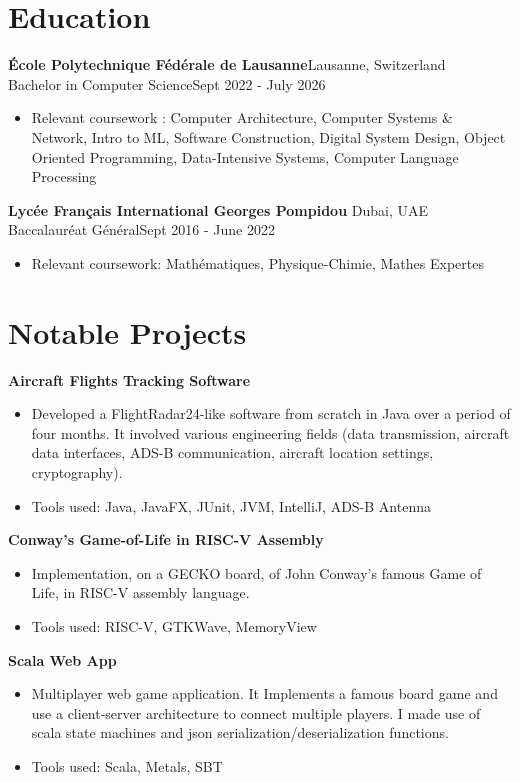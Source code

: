 \documentclass[a4paper, 10pt]{article}
\newenvironment{highlights}{
    \begin{itemize}[
        topsep=0.10 cm,
        parsep=0.10 cm,
        partopsep=0pt,
        itemsep=0pt,
        leftmargin=0.4 cm + 10pt
    ]
}{
    \end{itemize}
} %
\let\hrefWithoutArrow\href
\renewcommand{\href}[2]{\hrefWithoutArrow{#1}{\ifthenelse{\equal{#2}{}}{ }{#2 }\raisebox{.15ex}{\footnotesize \faExternalLink*}}}
\begin{document}
    \section{Education}
        \textbf{École Polytechnique Fédérale de Lausanne}\hfill Lausanne, Switzerland\\
        Bachelor in Computer Science\hfill Sept 2022 - July 2026
        \begin{highlights}
            \item Relevant coursework : Computer Architecture, Computer Systems \& Network, Intro to ML, Software Construction, Digital System Design, Object Oriented Programming, 
            Data-Intensive Systems, Computer Language Processing %
        \end{highlights}
        \textbf{Lycée Français International Georges Pompidou} \hfill Dubai, UAE\\
        Baccalauréat Général\hfill Sept 2016 - June 2022
        \begin{highlights}
            \item Relevant coursework: Mathématiques, Physique-Chimie, Mathes Expertes
        \end{highlights}
    
    \section{Notable Projects} 
        \textbf{Aircraft Flights Tracking Software}\href{https://github.com/relogamimano/Javions}{}
        \begin{highlights}
            \item Developed a FlightRadar24-like software from scratch in Java over a period of four months. It involved various
            engineering fields (data transmission, aircraft data interfaces, ADS-B communication, aircraft location settings, cryptography).
            \item Tools used: Java, JavaFX, JUnit, JVM, IntelliJ, ADS-B Antenna
        \end{highlights}

        \textbf{Conway's Game-of-Life in RISC-V Assembly}\href{https://github.com/relogamimano/Conway-s-Game-of-Life-in-RISC-V-Assembly}{}
        \begin{highlights}
            \item Implementation, on a GECKO board, of John Conway's famous Game of Life, in RISC-V assembly language.
            \item Tools used: RISC-V, GTKWave, MemoryView
        \end{highlights}
        \textbf{Scala Web App}\href{https://github.com/relogamimano/Scala-Web-App}{}
        \begin{highlights}
            \item Multiplayer web game application. It Implements a famous board game and use a client-server architecture to connect multiple players. I made use of scala state machines and json serialization/deserialization functions.
            \item Tools used: Scala, Metals, SBT
        \end{highlights}
\end{document}
